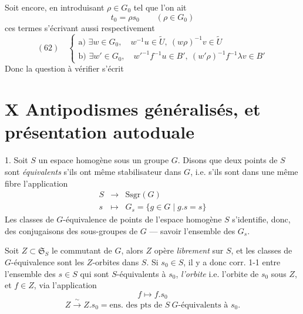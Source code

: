 \documentclass[11pt,a4paper]{article}
\begin{document}
Soit encore, en introduisant $\rho\in G_0$ tel que l'on ait
\[
t_0=\rho s_0\qquad(\rho\in G_0) \tag{61}
\]
ces termes s'écrivant aussi respectivement
\[
(62)\quad
\begin{cases}
\text{a) } \exists w\in G_0,\quad w^{-1}u\in\tilde{U},\ (w\rho)^{-1}v\in\tilde{U}\\
\text{b) } \exists w'\in G_0,\quad w'^{-1}f^{-1}u\in B',\ (w'\rho)^{-1}f^{-1}\lambda v\in B'
\end{cases}
\]
Donc la question à vérifier s'écrit


\section{X Antipodismes généralisés, et présentation autoduale}

1. Soit $S$ un espace homogène sous un groupe $G$. Disons que deux points de $S$ sont \emph{équivalents} s'ils ont même stabilisateur dans $G$, \struck{\ill{}} i.e. s'ils sont dans une même fibre   l'application
\[
\begin{array}{rcl}
S & \longrightarrow & \mathrm{Ssgr}(G)\\
s & \longmapsto & G_s=\{g\in G\mid g.s=s\}
\end{array} \tag{1}
\]
Les  classes de $G$-équivalence de points  de l'espace homogène $S$ s'identifie, donc,   des conjugaisons des sous-groupes de $G$ — savoir l'ensemble des $G_s$.

Soit $Z\subset\mathfrak{S}_S$ le commutant de $G$, alors $Z$ opère \emph{librement} sur $S$, et les classes de $G$-équivalence sont les $Z$-orbites dans $S$. Si $s_0\in S$, il y a donc corr. 1-1 entre l'ensemble des $s\in S$ qui sont $S$-équivalents à $s_0$,   \emph{l'orbite} i.e. l'orbite de $s_0$ sous $Z$, et  \struck{\ill{}} $f\in Z$, via l'application
\[
f\longmapsto f.s_0 \tag{2}
\]
\[
Z\xrightarrow{\ \sim\ }Z.s_0=\text{ens. des pts de } S\ G\text{-équivalents à } s_0 .
\]
\end{document}
